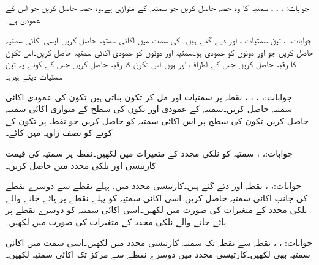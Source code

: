 جوابات: ، ، ، 
سمتیہ  کا وہ حصہ حاصل کریں جو سمتیہ  کے متوازی ہے۔وہ حصہ حاصل کریں جو اس کے عمودی ہے۔ 

جوابات: ، 
تین سمتیات ،  اور  دیے گئے ہیں۔ کی سمت میں اکائی سمتیہ حاصل کریں۔ایسی اکائی سمتیہ حاصل کریں جو  اور  دونوں کو عمودی ہو۔سمتیہ  اور  دونوں کو عمودی اکائی سمتیہ حاصل کریں۔اس تکون کا رقبہ حاصل کریں جس کے اطراف  اور  ہوں۔اس تکون کا رقبہ حاصل کریں جس کے کونے یہ تین سمتیات دیتے ہیں۔ 

جوابات:، ، ، ، 
نقطہ  پر سمتیات  اور  مل کر تکون بناتی ہیں۔تکون کی عمودی اکائی سمتیہ حاصل کریں۔سمتیہ  کے عمودی اور تکون کی سطح کے متوازی اکائی سمتیہ حاصل کریں۔تکون کی سطح پر اس اکائی سمتیہ کو حاصل کریں جو نقطہ  پر تکون کے کونے کو نصف زاویہ میں کاٹے۔

جوابات:، ، 
سمتیہ  کو نلکی محدد کے متغیرات میں لکھیں۔نقطہ  پر سمتیہ کی قیمت کارتیسی اور نلکی محدد میں حاصل کریں۔

جوابات:، ، 
نقطہ  اور  دئے گئے ہیں۔کارتیسی محدد میں، پہلے نقطے سے دوسرے نقطے کی جانب اکائی سمتیہ حاصل کریں۔اسی اکائی سمتیہ کو پہلے نقطے پر پائے جانے والے نلکی محدد کے متغیرات کی صورت میں لکھیں۔اسی اکائی سمتیہ کو دوسرے نقطے پر پائے جانے والے نلکی محدد کے متغیرات کی صورت میں لکھیں۔

جوابات: ، ، 
نقطہ  سے نقطہ  تک سمتیہ کارتیسی محدد میں لکھیں۔اسی سمت میں اکائی سمتیہ بھی لکھیں۔کارتیسی محدد میں دوسرے نقطے سے مرکز تک اکائی سمتیہ لکھیں۔

